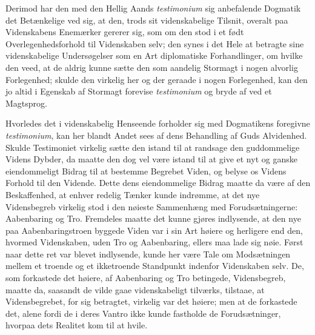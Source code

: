 \documentclass[11pt]{book}
\newcommand{\opage}[1]{\marginnote{\footnotesize\textit{[#1]}}}
\begin{document}
\opage{48} \setcounter{footnote}{0}%
Derimod har den med den Hellig Aands \textit{testimonium} sig
anbefalende Dogmatik det Betænkelige ved sig, at den, trods sit
videnskabelige Tilsnit, overalt paa Videnskabens Enemærker gererer
sig, som om den stod i et født Overlegenhedsforhold til Videnskaben
selv; den synes i det Hele at betragte sine videnskabelige
Undersøgelser som en Art diplomatiske Forhandlinger, om hvilke den
veed, at de aldrig kunne sætte den som aandelig Stormagt i nogen
alvorlig Forlegenhed; skulde den virkelig her og der geraade i nogen
Forlegenhed, kan den jo altid i Egenskab af Stormagt forevise
\textit{testimonium} og bryde af ved et Magtsprog.

Hvorledes det i videnskabelig Henseende forholder sig med
Dogmatikens foregivne \textit{testimonium}, kan her blandt Andet
sees af dens Behandling af Guds Alvidenhed. Skulde Testimoniet
virkelig sætte den istand til at randsage den guddommelige Videns
Dybder, da maatte den dog vel være istand til at give et nyt og
ganske eiendommeligt Bidrag til at
\opage{49} \setcounter{footnote}{0}%
bestemme Begrebet Viden, og belyse os Videns Forhold til den
Vidende. Dette dens eiendommelige Bidrag maatte da være af den
Beskaffenhed, at enhver redelig Tænker kunde indrømme, at det nye
Vidensbegreb virkelig stod i den nøieste Sammenhæng med
Forudsætningerne: Aabenbaring og Tro. Fremdeles maatte det kunne
gjøres indlysende, at den nye paa Aabenbaringstroen byggede Viden var
i sin Art høiere og herligere end den, hvormed Videnskaben, uden Tro
og Aabenbaring, ellers maa lade sig nøie. Først naar dette ret var
blevet indlysende, kunde her være Tale om Modsætningen mellem et
troende og et ikketroende Standpunkt indenfor Videnskaben selv. De,
som forkastede det høiere, af Aabenbaring og Tro betingede,
Vidensbegreb, maatte da, saasandt de vilde gaae videnskabeligt
tilværks, tilstaae, at Vidensbegrebet, for sig betragtet, virkelig
var det høiere; men at de forkastede det, alene fordi de i deres
Vantro ikke kunde fastholde de Forudsætninger, hvorpaa dets Realitet
kom til at hvile.
\end{document}
